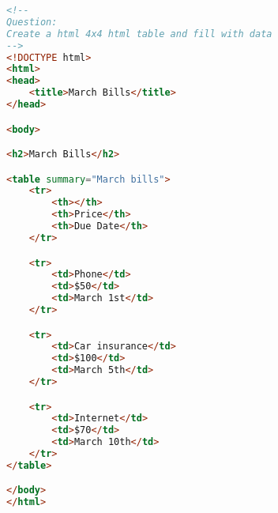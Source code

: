 \begin{lstlisting}[language=html,caption={exercise\_3.html},captionpos=b]
<!--
Question:
Create a html 4x4 html table and fill with data
-->
<!DOCTYPE html>
<html>
<head>
    <title>March Bills</title>
</head>

<body>

<h2>March Bills</h2>

<table summary="March bills">
    <tr>
        <th></th>
        <th>Price</th>
        <th>Due Date</th>
    </tr>

    <tr>
        <td>Phone</td>
        <td>$50</td>
        <td>March 1st</td>
    </tr>

    <tr>
        <td>Car insurance</td>
        <td>$100</td>
        <td>March 5th</td>
    </tr>

    <tr>
        <td>Internet</td>
        <td>$70</td>
        <td>March 10th</td>
    </tr>
</table>

</body>
</html>
\end{lstlisting}
